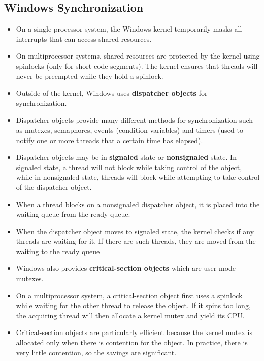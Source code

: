 \documentclass{article}
\theoremstyle{plain}
\theoremstyle{definition}
\begin{document}
\subsection{Windows Synchronization}
\begin{itemize}
    \item On a single processor system, the Windows kernel temporarily masks all interrupts that can access shared resources. 
    
    \item On multiprocessor systems, shared resources are protected by the kernel using spinlocks (only for short code segments). The kernel ensures that threads will never be preempted while they hold a spinlock.
    
    \item Outside of the kernel, Windows uses \textbf{dispatcher objects} for synchronization. 
    
    \item Dispatcher objects provide many different methods for synchronization such as mutexes, semaphores, events (condition variables) and timers (used to notify one or more threads that a certain time has elapsed).
    
    \item Dispatcher objects may be in \textbf{signaled} state or \textbf{nonsignaled} state. In signaled state, a thread will not block while taking control of the object, while in nonsignaled state, threads will block while attempting to take control of the dispatcher object. 
    
    \item When a thread blocks on a nonsignaled dispatcher object, it is placed into the waiting queue from the ready queue. 
    
    \item When the dispatcher object moves to signaled state, the kernel checks if any threads are waiting for it. If there are such threads, they are moved from the waiting to the ready queue
    
    \item Windows also provides \textbf{critical-section objects} which are user-mode mutexes.
    
    \item On a multiprocessor system, a critical-section object first uses a spinlock while waiting for the other thread to release the object. If it spins too long, the acquiring thread will then allocate a kernel mutex and yield its CPU.
    
    \item Critical-section objects are particularly efficient because the kernel mutex is allocated only when there is contention for the object. In practice, there is very little contention, so the savings are significant.
\end{itemize}
\end{document}
